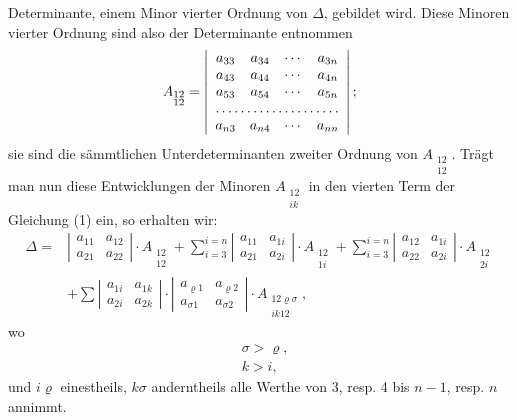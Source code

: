 \documentclass[11pt]{article}
\providecommand{\weberpage}[1]{}
\let\Delta\varDelta
\begin{document}
\weberpage{70}
Determinante, einem Minor vierter Ordnung von $\Delta$, gebildet wird. Diese Minoren vierter Ordnung sind also der Determinante entnommen
\[
A_{\substack{12\\12}} = \left|\begin{array}{cccc}
a_{33} & a_{34} & \cdots & a_{3n}\\
a_{43} & a_{44} & \cdots & a_{4n}\\
a_{53} & a_{54} & \cdots & a_{5n}\\
\hdotsfor{4}\\
a_{n3} & a_{n4} & \cdots & a_{nn}
\end{array}\right|;
\]
sie sind die sämmtlichen Unterdeterminanten zweiter Ordnung von $A_{\substack{12\\12}}$. Trägt man nun diese Entwicklungen der Minoren $A_{\substack{12\\ik}}$ in den vierten Term der Gleichung (1) ein, so erhalten wir:
\[
\begin{aligned}
\Delta = {}& \left|\begin{array}{cc} a_{11} & a_{12}\\ a_{21} & a_{22}\end{array}\right|\cdot A_{\substack{12\\12}}
+ \sum_{i=3}^{i=n}\left|\begin{array}{cc} a_{11} & a_{1i}\\ a_{21} & a_{2i}\end{array}\right|\cdot A_{\substack{12\\1i}}
+ \sum_{i=3}^{i=n}\left|\begin{array}{cc} a_{12} & a_{1i}\\ a_{22} & a_{2i}\end{array}\right|\cdot A_{\substack{12\\2i}}\\
&+ \sum \left|\begin{array}{cc} a_{1i} & a_{1k}\\ a_{2i} & a_{2k}\end{array}\right|\cdot \left|\begin{array}{cc} a_{\varrho1} & a_{\varrho2}\\ a_{\sigma1} & a_{\sigma2}\end{array}\right|\cdot A_{\substack{12\varrho\sigma\\ik12}},
\end{aligned}
\]
wo
\[
\begin{aligned}
&\sigma>\varrho,\\
&k>i,
\end{aligned}
\]
und $i\varrho$ einestheils, $k\sigma$ anderntheils alle Werthe von 3, resp. 4 bis $n-1$, resp. $n$ annimmt.
\end{document}
